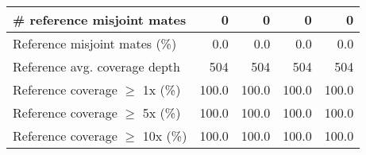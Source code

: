 \documentclass[12pt,a4paper]{article}
\begin{document}
\begin{table}[ht]
\begin{center}
\begin{tabular}{|l*{4}{|r}|}
\# reference misjoint mates & 0 & 0 & 0 & 0 \\ \hline
Reference misjoint mates (\%) & 0.0 & 0.0 & 0.0 & 0.0 \\ \hline
Reference avg. coverage depth & 504 & 504 & 504 & 504 \\ \hline
Reference coverage $\geq$ 1x (\%) & 100.0 & 100.0 & 100.0 & 100.0 \\ \hline
Reference coverage $\geq$ 5x (\%) & 100.0 & 100.0 & 100.0 & 100.0 \\ \hline
Reference coverage $\geq$ 10x (\%) & 100.0 & 100.0 & 100.0 & 100.0 \\ \hline
\end{tabular}
\end{center}
\end{table}
\end{document}
